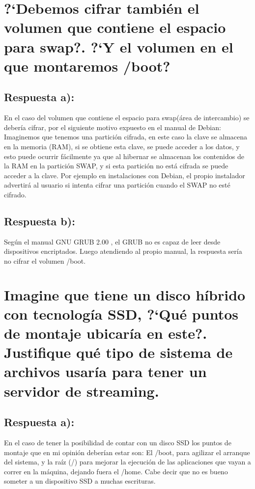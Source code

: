 \section{?`Debemos cifrar también el volumen que contiene el espacio para swap?. ?`Y el volumen en el que montaremos /boot?}
\subsection{Respuesta a):}
En el caso del volumen que contiene el espacio para swap(área de intercambio) se debería cifrar, por el siguiente motivo expuesto en el manual de Debian:
Imaginemos que tenemos una partición cifrada, en este caso la clave se almacena en la memoria (RAM), si se obtiene esta clave, se puede acceder a los datos, y esto puede ocurrir fácilmente ya que al hibernar se almacenan los contenidos de la RAM en la partición SWAP, y si esta partición no está cifrada se puede acceder a la clave. Por ejemplo en instalaciones con Debian, el propio instalador advertirá al usuario si intenta cifrar una partición cuando el SWAP no esté cifrado.\cite{ManualInstalacionDebian}
\subsection{Respuesta b):}
Según el manual GNU GRUB 2.00 \cite{cuestion8BB}, el GRUB no es capaz de leer desde dispositivos encriptados. Luego atendiendo al propio manual, la respuesta sería no cifrar el volumen /boot.

\section{Imagine que tiene un disco híbrido con tecnología SSD, ?`Qué puntos de montaje ubicaría en este?. Justifique qué tipo de sistema de archivos usaría para tener un servidor de streaming.}
\subsection{Respuesta a):}
En el caso de tener la posibilidad de contar con un disco SSD los puntos de montaje que en mi opinión deberían estar son:
El /boot, para agilizar el arranque del sistema, y la raíz (/) para mejorar la ejecución de las aplicaciones que vayan a correr en la máquina, dejando fuera el /home.
Cabe decir que no es bueno someter a un dispositivo SSD a muchas escrituras.
\newpage
